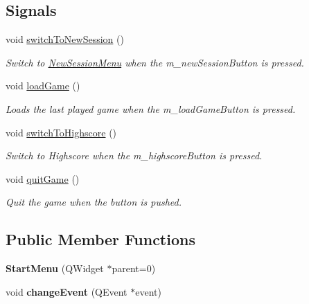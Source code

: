 \subsection*{Signals}
\begin{DoxyCompactItemize}
\item 
\hypertarget{classStartMenu_a94d2da8144b5e99707ef5dc1ea588982}{void \hyperlink{classStartMenu_a94d2da8144b5e99707ef5dc1ea588982}{switch\-To\-New\-Session} ()}\label{classStartMenu_a94d2da8144b5e99707ef5dc1ea588982}

\begin{DoxyCompactList}\small\item\em Switch to \hyperlink{classNewSessionMenu}{New\-Session\-Menu} when the m\-\_\-new\-Session\-Button is pressed. \end{DoxyCompactList}\item 
\hypertarget{classStartMenu_af20eda82374b32755e6d9743079f68d6}{void \hyperlink{classStartMenu_af20eda82374b32755e6d9743079f68d6}{load\-Game} ()}\label{classStartMenu_af20eda82374b32755e6d9743079f68d6}

\begin{DoxyCompactList}\small\item\em Loads the last played game when the m\-\_\-load\-Game\-Button is pressed. \end{DoxyCompactList}\item 
\hypertarget{classStartMenu_a95881192196673c85ad1dc12df5f9820}{void \hyperlink{classStartMenu_a95881192196673c85ad1dc12df5f9820}{switch\-To\-Highscore} ()}\label{classStartMenu_a95881192196673c85ad1dc12df5f9820}

\begin{DoxyCompactList}\small\item\em Switch to Highscore when the m\-\_\-highscore\-Button is pressed. \end{DoxyCompactList}\item 
\hypertarget{classStartMenu_aff58f89652b89899b21d40f3188b516d}{void \hyperlink{classStartMenu_aff58f89652b89899b21d40f3188b516d}{quit\-Game} ()}\label{classStartMenu_aff58f89652b89899b21d40f3188b516d}

\begin{DoxyCompactList}\small\item\em Quit the game when the button is pushed. \end{DoxyCompactList}\end{DoxyCompactItemize}
\subsection*{Public Member Functions}
\begin{DoxyCompactItemize}
\item 
\hypertarget{classStartMenu_a1491fb2672b951483f3cfc0594571fbb}{{\bfseries Start\-Menu} (Q\-Widget $\ast$parent=0)}\label{classStartMenu_a1491fb2672b951483f3cfc0594571fbb}

\item 
\hypertarget{classStartMenu_afc4a48db40567e80c6514b0af30d3797}{void {\bfseries change\-Event} (Q\-Event $\ast$event)}\label{classStartMenu_afc4a48db40567e80c6514b0af30d3797}

\end{DoxyCompactItemize}


